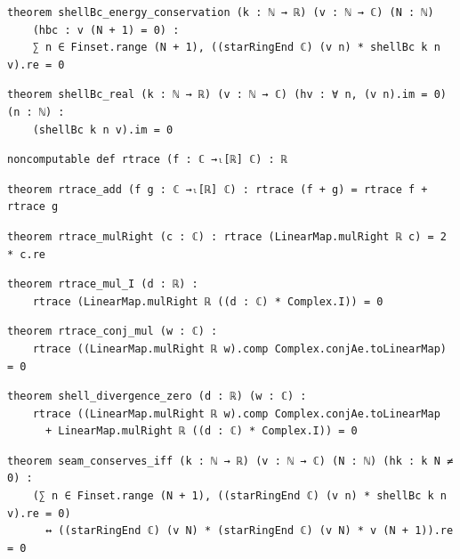 \begin{lstlisting}[style=leancat]
theorem shellBc_energy_conservation (k : ℕ → ℝ) (v : ℕ → ℂ) (N : ℕ)
    (hbc : v (N + 1) = 0) :
    ∑ n ∈ Finset.range (N + 1), ((starRingEnd ℂ) (v n) * shellBc k n v).re = 0
\end{lstlisting}

\begin{lstlisting}[style=leancat]
theorem shellBc_real (k : ℕ → ℝ) (v : ℕ → ℂ) (hv : ∀ n, (v n).im = 0) (n : ℕ) :
    (shellBc k n v).im = 0
\end{lstlisting}

\begin{lstlisting}[style=leancat]
noncomputable def rtrace (f : ℂ →ₗ[ℝ] ℂ) : ℝ
\end{lstlisting}

\begin{lstlisting}[style=leancat]
theorem rtrace_add (f g : ℂ →ₗ[ℝ] ℂ) : rtrace (f + g) = rtrace f + rtrace g
\end{lstlisting}

\begin{lstlisting}[style=leancat]
theorem rtrace_mulRight (c : ℂ) : rtrace (LinearMap.mulRight ℝ c) = 2 * c.re
\end{lstlisting}

\begin{lstlisting}[style=leancat]
theorem rtrace_mul_I (d : ℝ) :
    rtrace (LinearMap.mulRight ℝ ((d : ℂ) * Complex.I)) = 0
\end{lstlisting}

\begin{lstlisting}[style=leancat]
theorem rtrace_conj_mul (w : ℂ) :
    rtrace ((LinearMap.mulRight ℝ w).comp Complex.conjAe.toLinearMap) = 0
\end{lstlisting}

\begin{lstlisting}[style=leancat]
theorem shell_divergence_zero (d : ℝ) (w : ℂ) :
    rtrace ((LinearMap.mulRight ℝ w).comp Complex.conjAe.toLinearMap
      + LinearMap.mulRight ℝ ((d : ℂ) * Complex.I)) = 0
\end{lstlisting}

\begin{lstlisting}[style=leancat]
theorem seam_conserves_iff (k : ℕ → ℝ) (v : ℕ → ℂ) (N : ℕ) (hk : k N ≠ 0) :
    (∑ n ∈ Finset.range (N + 1), ((starRingEnd ℂ) (v n) * shellBc k n v).re = 0)
      ↔ ((starRingEnd ℂ) (v N) * (starRingEnd ℂ) (v N) * v (N + 1)).re = 0
\end{lstlisting}

